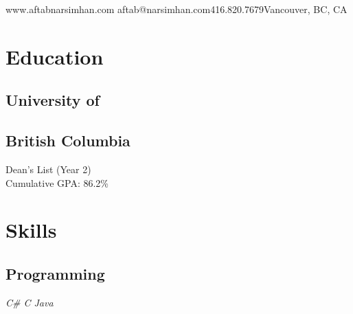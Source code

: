 \documentclass[]{aftab-resume}
\begin{document}
       {www.aftabnarsimhan.com}
       {aftab@narsimhan.com}{416.820.7679}{Vancouver, BC, CA}
       

%
%

\begin{minipage}[t]{0.33\textwidth} 


\section{Education}
\vspace{0.15cm}

\subsection{University of}
\subsection{British Columbia}
\vspace{0.05cm}
\vspace{0.05cm}
\vspace{0.05cm}
\textbullet{} Dean's List (Year 2) \\
\textbullet{} Cumulative GPA: 86.2\%
\vspace{0.075cm}

\vspace{0.75cm}


\section{Skills}
\vspace{0.15cm}

\subsection{Programming}
\vspace{0.01cm}

\it{\textbullet{} C\# \textbullet{} C \textbullet{} Java \\ }
\vspace{0.05cm}


\end{minipage}
\end{document}
